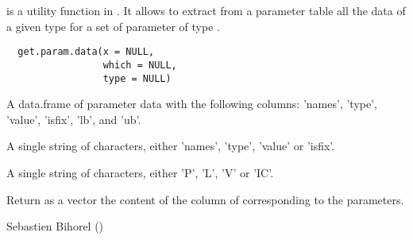 %
\begin{Description}\relax
{} is a utility function in . It allows to 
extract from a parameter table  all the data of a given type
 for a set of parameter of type .
\end{Description}
%
\begin{Usage}
\begin{verbatim}
  get.param.data(x = NULL,
                 which = NULL,
                 type = NULL)
\end{verbatim}
\end{Usage}
%
\begin{Arguments}
\begin{ldescription}
\item[\code{x}] A data.frame of parameter data with the following columns: 'names', 
'type', 'value', 'isfix', 'lb', and 'ub'.
\item[\code{which}] A single string of characters, either 'names', 'type', 'value' or
'isfix'.
\item[\code{type}] A single string of characters, either 'P', 'L', 'V' or 'IC'.
\end{ldescription}
\end{Arguments}
%
\begin{Value}
Return as a vector the content of the  column of  
corresponding to the  parameters.
\end{Value}
%
\begin{Author}\relax
Sebastien Bihorel ()
\end{Author}
